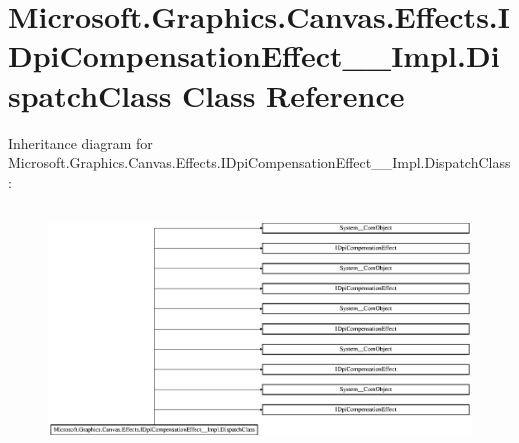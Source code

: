 \hypertarget{class_microsoft_1_1_graphics_1_1_canvas_1_1_effects_1_1_i_dpi_compensation_effect_____impl_1_1_dispatch_class}{}\section{Microsoft.\+Graphics.\+Canvas.\+Effects.\+I\+Dpi\+Compensation\+Effect\+\_\+\+\_\+\+Impl.\+Dispatch\+Class Class Reference}
\label{class_microsoft_1_1_graphics_1_1_canvas_1_1_effects_1_1_i_dpi_compensation_effect_____impl_1_1_dispatch_class}
Inheritance diagram for Microsoft.\+Graphics.\+Canvas.\+Effects.\+I\+Dpi\+Compensation\+Effect\+\_\+\+\_\+\+Impl.\+Dispatch\+Class\+:\begin{figure}[H]
\begin{center}
\leavevmode
\includegraphics[height=6.470589cm]{class_microsoft_1_1_graphics_1_1_canvas_1_1_effects_1_1_i_dpi_compensation_effect_____impl_1_1_dispatch_class}
\end{center}
\end{figure}
